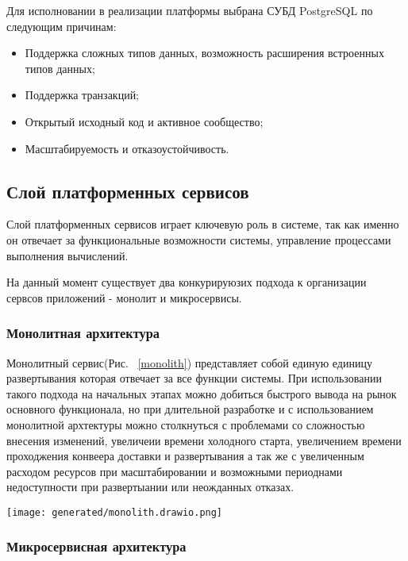 Для исполновании в реализации платформы выбрана СУБД PostgreSQL по следующим причинам:

\begin{itemize}
  \item[---] Поддержка сложных типов данных, возможность расширения встроенных типов данных;
  \item[---] Поддержка транзакций;
  \item[---] Открытый исходный код и активное сообщество;
  \item[---] Масштабируемость и отказоустойчивость.
\end{itemize}

\subsection{Слой платформенных сервисов}

Слой платформенных сервисов играет ключевую роль в системе, так как именно он отвечает за функциональные возможности системы, управление процессами выполнения вычислений.

На данный момент существует два конкурируюзих подхода к организации сервсов приложений - монолит и микросервисы\cite{newman2019monolith}.

\subsubsection{Монолитная архитектура}

Монолитный сервис(Рис. ~\ref{monolith}) представляет собой единую единицу развертывания которая отвечает за все функции системы. При использовании такого подхода на начальных этапах можно добиться быстрого вывода на рынок основного функционала, но при длительной разработке и с использованием монолитной архтектуры можно столкнуться с проблемами со сложностью внесения изменений, увеличеии времени холодного старта, увеличением времени проходжения конвеера доставки и развертывания а так же с увеличенным расходом ресурсов при масштабировании и возможными периоднами недоступности при развертыании или неожданных отказах.

\begin{figure*}[!t]
  \centering
  \texttt{[image: generated/monolith.drawio.png]}
  \caption{Приложение с монолитной архитектурой}
  \label{monolith}
\end{figure*}

\subsubsection{Микросервисная архитектура}

